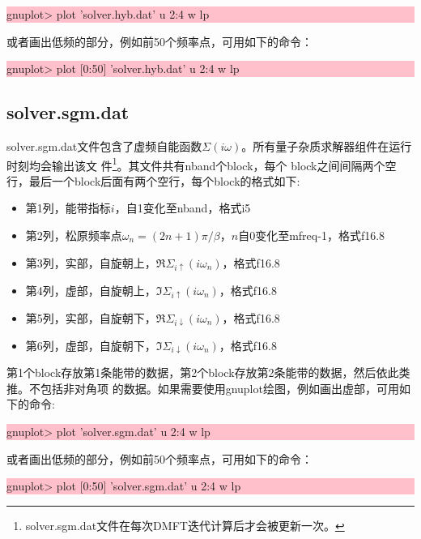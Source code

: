 \noindent\colorbox{pink}{\parbox[r]{\linewidth}{\quad gnuplot> plot 'solver.hyb.dat' u 2:4 w lp }}
或者画出低频的部分，例如前50个频率点，可用如下的命令：

\noindent\colorbox{pink}{\parbox[r]{\linewidth}{\quad gnuplot> plot [0:50] 'solver.hyb.dat' u 2:4 w lp }}

\subsection{solver.sgm.dat}
solver.sgm.dat文件包含了虚频自能函数$\Sigma(i\omega)$。所有量子杂质求解器组件在运行时刻均会输出该文
件\footnote{solver.sgm.dat文件在每次DMFT迭代计算后才会被更新一次。}。其文件共有nband个block，每个
block之间间隔两个空行，最后一个block后面有两个空行，每个block的格式如下:
\begin{itemize}
\item 第1列，能带指标$i$，自1变化至nband，格式i5
\item 第2列，松原频率点$\omega_{n}=(2n+1)\pi/\beta$，$n$自0变化至mfreq-1，格式f16.8
\item 第3列，实部，自旋朝上，$\Re \Sigma_{i\uparrow}(i\omega_{n})$，格式f16.8
\item 第4列，虚部，自旋朝上，$\Im \Sigma_{i\uparrow}(i\omega_{n})$，格式f16.8
\item 第5列，实部，自旋朝下，$\Re \Sigma_{i\downarrow}(i\omega_{n})$，格式f16.8
\item 第6列，虚部，自旋朝下，$\Im \Sigma_{i\downarrow}(i\omega_{n})$，格式f16.8
\end{itemize}
第1个block存放第1条能带的数据，第2个block存放第2条能带的数据，然后依此类推。不包括非对角项
的数据。如果需要使用gnuplot绘图，例如画出虚部，可用如下的命令:

\noindent\colorbox{pink}{\parbox[r]{\linewidth}{\quad gnuplot> plot 'solver.sgm.dat' u 2:4 w lp }}
或者画出低频的部分，例如前50个频率点，可用如下的命令：

\noindent\colorbox{pink}{\parbox[r]{\linewidth}{\quad gnuplot> plot [0:50] 'solver.sgm.dat' u 2:4 w lp }}

